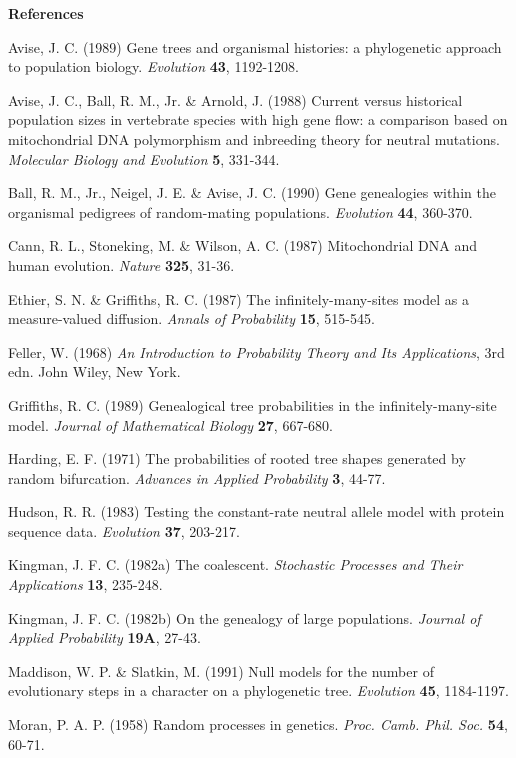 {\bf References}
\medskip
{
\setlength{\parindent}{-0.2in}

Avise, J. C. (1989)  Gene trees and organismal histories: a phylogenetic
approach to population biology.  {\it Evolution}  {\bf 43}, 1192-1208.
\medskip

Avise, J. C., Ball, R. M., Jr. \& Arnold, J. (1988)  Current versus
historical population sizes in vertebrate species with high gene flow: a
comparison based on mitochondrial DNA polymorphism and inbreeding theory
for neutral mutations.  {\it Molecular Biology and Evolution}  {\bf 5}, 331-344.  
\medskip

Ball, R. M., Jr., Neigel, J. E. \& Avise, J. C. (1990)  Gene genealogies
within the organismal pedigrees of random-mating populations.  {\it Evolution}
{\bf 44}, 360-370.
\medskip

Cann, R. L., Stoneking, M. \& Wilson, A. C.  (1987)  Mitochondrial DNA and
human evolution.  {\it Nature}  {\bf 325}, 31-36.
\medskip

Ethier, S. N. \& Griffiths, R. C.  (1987)  The infinitely-many-sites model as
a measure-valued diffusion.  {\it Annals of Probability} {\bf 15}, 515-545.
\medskip

Feller, W.  (1968)  {\it An Introduction to Probability Theory and Its
Applications}, 3rd edn.  John Wiley, New York.
\medskip

Griffiths, R. C.  (1989)  Genealogical tree probabilities in the
infinitely-many-site model.  {\it Journal of Mathematical Biology} {\bf 27},
667-680.
\medskip

Harding, E. F.  (1971)   The probabilities of rooted tree shapes
generated by random bifurcation.  {\it Advances in Applied Probability}
{\bf 3}, 44-77.
\medskip

Hudson, R. R. (1983)  Testing the constant-rate neutral allele model
with protein sequence data.  {\it Evolution}  {\bf 37}, 203-217.
\medskip

Kingman, J. F. C. (1982a)  The coalescent.  {\it Stochastic Processes and Their
Applications}  {\bf 13}, 235-248.
\medskip

Kingman, J. F. C. (1982b)  On the genealogy of large populations.  {\it
Journal of Applied Probability}  {\bf 19A}, 27-43.
\medskip

Maddison, W. P. \& Slatkin, M. (1991)  Null models for the number
of evolutionary steps in a character on a phylogenetic tree.  {\it Evolution}
{\bf 45}, 1184-1197.
\medskip

Moran, P. A. P.  (1958)  Random processes in genetics.  {\it Proc. Camb. Phil.
Soc.} {\bf 54}, 60-71.
\medskip

}
